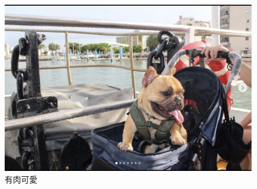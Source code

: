 


\begin{figure}[!htbp]

\centering


\includegraphics[width=1\textwidth]{images/yolo.png}

\caption{有肉可愛}



\label{i:flow chart}
\end{figure}



